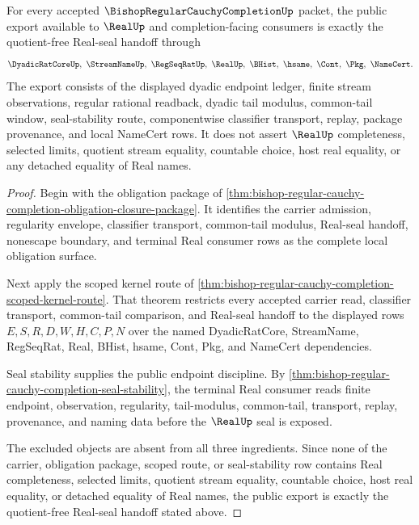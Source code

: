 \begin{theorem}
\label{thm:bishop-regular-cauchy-completion-public-real-seal}
For every accepted $\BishopRegularCauchyCompletionUp$ packet, the public export available to $\RealUp$ and completion-facing consumers is exactly the quotient-free Real-seal handoff through
$$
\DyadicRatCoreUp,\ \StreamNameUp,\ \RegSeqRatUp,\ \RealUp,\ \BHist,\ \hsame,\ \Cont,\ \Pkg,\ \NameCert .
$$
The export consists of the displayed dyadic endpoint ledger, finite stream observations, regular rational readback, dyadic tail modulus, common-tail window, seal-stability route, componentwise classifier transport, replay, package provenance, and local NameCert rows. It does not assert $\RealUp$ completeness, selected limits, quotient stream equality, countable choice, host real equality, or any detached equality of Real names.
\end{theorem}
\begin{proof}
Begin with the obligation package of \autoref{thm:bishop-regular-cauchy-completion-obligation-closure-package}. It identifies the carrier admission, regularity envelope, classifier transport, common-tail modulus, Real-seal handoff, nonescape boundary, and terminal Real consumer rows as the complete local obligation surface.

Next apply the scoped kernel route of \autoref{thm:bishop-regular-cauchy-completion-scoped-kernel-route}. That theorem restricts every accepted carrier read, classifier transport, common-tail comparison, and Real-seal handoff to the displayed rows $E,S,R,D,W,H,C,P,N$ over the named DyadicRatCore, StreamName, RegSeqRat, Real, BHist, hsame, Cont, Pkg, and NameCert dependencies.

Seal stability supplies the public endpoint discipline. By \autoref{thm:bishop-regular-cauchy-completion-seal-stability}, the terminal Real consumer reads finite endpoint, observation, regularity, tail-modulus, common-tail, transport, replay, provenance, and naming data before the $\RealUp$ seal is exposed.

The excluded objects are absent from all three ingredients. Since none of the carrier, obligation package, scoped route, or seal-stability row contains Real completeness, selected limits, quotient stream equality, countable choice, host real equality, or detached equality of Real names, the public export is exactly the quotient-free Real-seal handoff stated above.
\end{proof}


